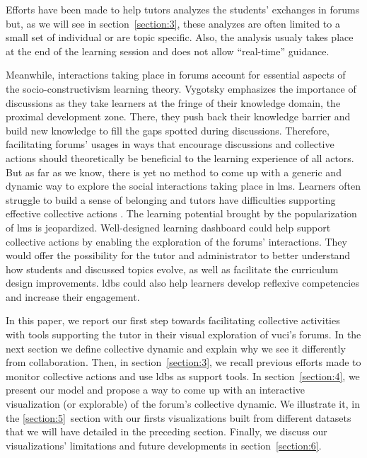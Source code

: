 \documentclass[a4paper,twoside]{article}
\begin{document}
Efforts have been made to help tutors analyzes the students' exchanges in forums but, as we will see in section~\ref{section:3}, these analyzes are often limited to a small set of individual or are topic specific.  Also, the analysis usualy takes place at the end of the learning session and does not allow ``real-time'' guidance.

Meanwhile, interactions taking place in forums account for essential aspects of the socio-constructivism learning theory.  Vygotsky emphasizes the importance of discussions as they take learners at the fringe of their knowledge domain, the proximal development zone.  There, they push back their knowledge barrier and build new knowledge to fill the gaps spotted during discussions.  Therefore, facilitating forums' usages in ways that encourage discussions and collective actions should theoretically be beneficial to the learning experience of all actors.  But as far as we know, there is yet no method to come up with a generic and dynamic way to explore the social interactions taking place in \gls{lms}.  Learners often struggle to build a sense of belonging \citep{Khalil2014} and tutors have difficulties supporting effective collective actions \citep{Zheng2015}.  The learning potential brought by the popularization of \gls{lms} is jeopardized.
Well-designed learning dashboard could help support collective actions by enabling the exploration of the forums' interactions.  They would offer the possibility for the tutor and administrator to better understand how students and discussed topics evolve, as well as facilitate the curriculum design improvements.  \glspl{ldb} could also help learners develop reflexive competencies and increase their engagement.


In this paper, we report our first step towards facilitating collective activities with tools supporting the tutor in their visual exploration of \gls{vuci}'s forums.
In the next section we define collective dynamic and explain why we see it differently from collaboration.  Then, in section~\ref{section:3}, we recall previous efforts made to  monitor collective actions and use \glspl{ldb} as support tools.  In section~\ref{section:4}, we present our model and propose a way to come up with an interactive visualization (or explorable) of the forum's collective dynamic.  We illustrate it, in the \ref{section:5}~section with our firsts visualizations built from different datasets that we will have detailed in the preceding section.  Finally, we discuss our visualizations' limitations and future developments in section~\ref{section:6}.
\end{document}
